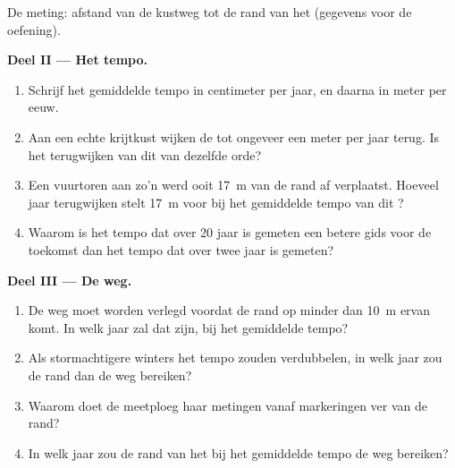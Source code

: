\begin{problem}
\begin{omfigure}
{\small De meting: afstand van de kustweg tot de rand van het 
(gegevens voor de oefening).}
\label{fig:g9:landforms:survey}
\end{omfigure}

\noindent\textbf{Deel II --- Het tempo.}\par\nopagebreak
\begin{enumerate}[resume, beginpenalty=10000]
  \item Schrijf het gemiddelde tempo in centimeter per jaar, en daarna in
        meter per eeuw.
  \item Aan een echte krijtkust wijken de  tot ongeveer een meter
        per jaar terug. Is het terugwijken van dit  van dezelfde orde?
  \item Een vuurtoren aan zo'n  werd ooit \qty{17}{m} van de rand af
        verplaatst. Hoeveel jaar terugwijken stelt \qty{17}{m} voor bij het
        gemiddelde tempo van dit ?
  \item Waarom is het tempo dat over 20 jaar is gemeten een betere gids
        voor de toekomst dan het tempo dat over twee jaar is gemeten?
\end{enumerate}

\noindent\textbf{Deel III --- De weg.}\par\nopagebreak
\begin{enumerate}[resume, beginpenalty=10000]
  \item De weg moet worden verlegd voordat de rand op minder dan
        \qty{10}{m} ervan komt. In welk jaar zal dat zijn, bij het
        gemiddelde tempo?
  \item Als stormachtigere winters het tempo zouden verdubbelen, in welk
        jaar zou de rand dan de weg bereiken?
  \item Waarom doet de meetploeg haar metingen vanaf markeringen ver van de
        rand?
  \item In welk jaar zou de rand van het  bij het gemiddelde tempo de
        weg bereiken?
\end{enumerate}
\end{problem}
